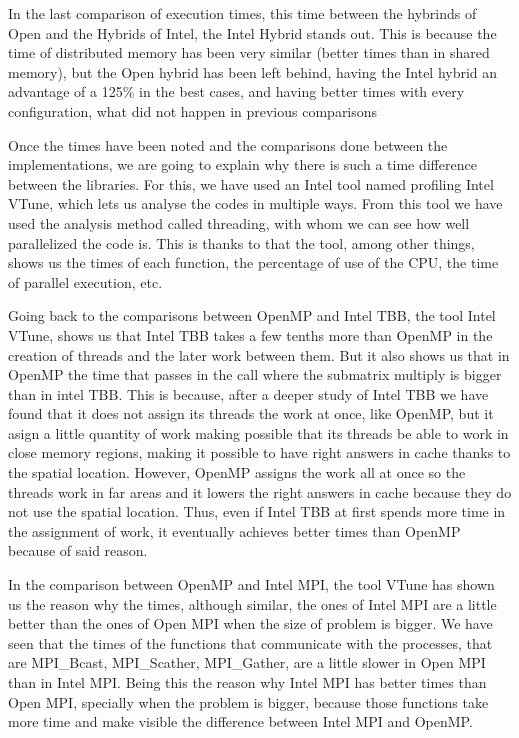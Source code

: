 \documentclass[a4paper,12pt]{article}
\begin{document}
In the last comparison of execution times, this time between the hybrinds of Open and the Hybrids of Intel, the Intel Hybrid stands out. This is because the time of distributed memory has been very similar (better times than in shared memory), but the Open hybrid has been left behind, having the Intel hybrid an advantage of a 125\% in the best cases, and having better times with every configuration, what did not happen in previous comparisons

Once the times have been noted and the comparisons done between the implementations, we are going to explain why there is such a time difference between the libraries. For this, we have used an Intel tool named profiling Intel VTune, which lets us analyse the codes in multiple ways. From this tool we have used the analysis method called threading, with whom we can see how well parallelized the code is. This is thanks to that the tool, among other things, shows us the times of each function, the percentage of use of the CPU, the time of parallel execution, etc.

Going back to the comparisons between OpenMP and Intel TBB, the tool Intel VTune, shows us that Intel TBB takes a few tenths more than OpenMP in the creation of threads and the later work between them. But it also shows us that in OpenMP the time that passes in the call where the submatrix multiply is bigger than in intel TBB. This is because, after a deeper study of Intel TBB we have found that it does not assign its threads the work at once, like OpenMP, but it asign a little quantity of work making possible that its threads be able to work in close memory regions, making it possible to have right answers in cache thanks to the spatial location. However, OpenMP assigns the work all at once so the threads work in far areas and it lowers the right answers in cache because they do not use the spatial location. Thus, even if Intel TBB at first spends more time in the assignment of work, it eventually achieves better times than OpenMP because of said reason.

In the comparison between OpenMP and Intel MPI, the tool VTune has shown us the reason why the times, although similar, the ones of Intel MPI are a little better than the ones of Open MPI when the size of problem is bigger. We have seen that the times of the functions that communicate with the processes, that are MPI\_Bcast, MPI\_Scather, MPI\_Gather, are a little slower in Open MPI than in Intel MPI. Being this the reason why Intel MPI has better times than Open MPI, specially when the problem is bigger, because those functions take more time and make visible the difference between Intel MPI and OpenMP.
\end{document}

